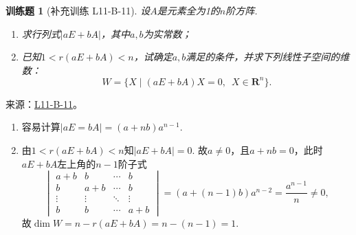 \documentclass[UTF8,12pt,a4paper,fontset=fandol]{ctexart}
\newtheorem{exercise}{训练题}[section]
\begin{document}
\begin{exercise}[补充训练 L11-B-11]\label{prob:L11-B-11}
设$A$是元素全为1的$n$阶方阵.
        \begin{enumerate}
            \item 求行列式$|aE+bA|$，其中$a,b$为实常数；

            \item 已知$1<r(aE+bA)<n$，试确定$a,b$满足的条件，并求下列线性子空间的维数：
                  \[W=\{X \mid (aE+bA)X=0,\enspace X\in\mathbf{R}^n\}.\]
        \end{enumerate}
\end{exercise}
\noindent 来源：\href{https://github.com/yhwu-is/Linear-Algebra-Left-Undone/blob/new/%E8%AE%B2%E4%B9%89/%E4%B8%93%E9%A2%98/11%20%E6%9C%9D%E8%8A%B1%E5%A4%95%E6%8B%BE.tex}{L11-B-11}。
\begin{solve}
\begin{enumerate}
                \item 容易计算$|aE=bA|=(a+nb)a^{n-1}$.

                \item 由$1<r(aE+bA)<n$知$|aE+bA|=0$. 故$a\neq 0$，且$a+nb=0$，此时$aE+bA$左上角的$n-1$阶子式
                      \[ \begin{vmatrix}
                              a+b    & b      & \cdots & b      \\
                              b      & a+b    & \cdots & b      \\
                              \vdots & \vdots & \ddots & \vdots \\
                              b      & b      & \cdots & a+b
                          \end{vmatrix}=(a+(n-1)b)a^{n-2}=\frac{a^{n-1}}{n}\neq 0, \]
                      故$\dim{W}=n-r(aE+bA)=n-(n-1)=1$.
            \end{enumerate}
\end{solve}
\end{document}
